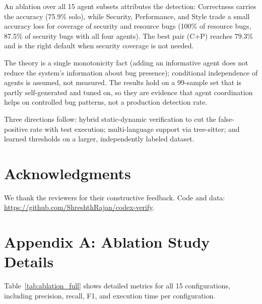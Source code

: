 \documentclass[10pt,twocolumn]{article}
\begin{document}
An ablation over all 15 agent subsets attributes the detection: Correctness carries the accuracy (75.9\% solo), while Security, Performance, and Style trade a small accuracy loss for coverage of security and resource bugs (100\% of resource bugs, 87.5\% of security bugs with all four agents). The best pair (C+P) reaches 79.3\% and is the right default when security coverage is not needed.

The theory is a single monotonicity fact (adding an informative agent does not reduce the system's information about bug presence); conditional independence of agents is assumed, not measured. The results hold on a 99-sample set that is partly self-generated and tuned on, so they are evidence that agent coordination helps on controlled bug patterns, not a production detection rate.

Three directions follow: hybrid static-dynamic verification to cut the false-positive rate with test execution; multi-language support via tree-sitter; and learned thresholds on a larger, independently labeled dataset.


\section*{Acknowledgments}
\small
We thank the reviewers for their constructive feedback. Code and data: \url{https://github.com/ShreshthRajan/codex-verify}.






\appendix

\section{Appendix A: Ablation Study Details}

Table~\ref{tab:ablation_full} shows detailed metrics for all 15 configurations, including precision, recall, F1, and execution time per configuration.
\end{document}
